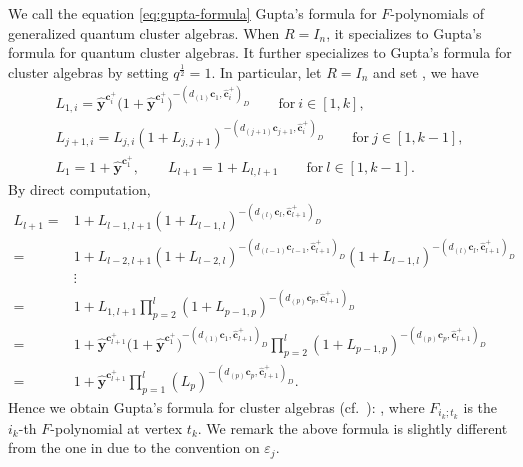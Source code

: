 \documentclass[pdftex]{sigma}
\numberwithin{equation}{section}
\begin{document}
\begin{Remark}
 We call the equation \eqref{eq:gupta-formula} Gupta's formula for $F$-polynomials of generalized quantum cluster algebras. When $R=I_n$, it specializes to Gupta's formula
 for quantum cluster algebras. It further specializes to Gupta's formula \cite{gupta2019,LMN2023} for cluster algebras by setting $q^{\frac{1}{2}}=1$. In particular, let $R=I_n$ and set , we have
 \begin{gather*}
L_{1,i}=\hat{\mathbf{y}}^{\mathbf{c}_{i}^+}\bigl(1+\hat{\mathbf{y}}^{\mathbf{c}_{1}^{+}}\bigr)^{-(d_{(1)}\mathbf{c}_{1},\hat{\mathbf{c}}_{i}^{+})_{D}}\qquad \text{for} \ i\in[1,k],\\
L_{j+1,i}=L_{j,i}(1+L_{j,j+1})^{-(d_{(j+1)}\mathbf{c}_{j+1},\hat{\mathbf{c}}_{i}^{+})_D}\qquad \text{for} \  j\in[1,k-1],\\
L_{1}=1+\hat{\mathbf{y}}^{\mathbf{c}_{1}^{+}},\qquad
L_{l+1}=1+L_{l,l+1}\qquad \text{for} \  l\in[1,k-1].
\end{gather*}
By direct computation,
\begin{align*}
 L_{l+1}={}&1+L_{l-1,l+1}(1+L_{l-1,l})^{-(d_{(l)}\mathbf{c}_{l},\hat{\mathbf{c}}_{l+1}^{+})_D}\\
 ={}&1+L_{l-2,l+1}(1+L_{l-2,l})^{-(d_{(l-1)}\mathbf{c}_{l-1},\hat{\mathbf{c}}_{l+1}^{+})_D}(1+L_{l-1,l})^{-(d_{(l)}\mathbf{c}_{l},\hat{\mathbf{c}}_{l+1}^{+})_D}\\
 & \vdots\\
 ={}&1+L_{1,l+1}\prod\limits^{l}_{p=2}(1+L_{p-1,p})^{-(d_{(p)}\mathbf{c}_{p},\hat{\mathbf{c}}_{l+1}^{+})_D}\\
 ={}&1+\hat{\mathbf{y}}^{\mathbf{c}_{l+1}^{+}}\bigl(1+\hat{\mathbf{y}}^{\mathbf{c}_{1}^{+}}\bigr)^{-(d_{(1)}\mathbf{c}_{1},\hat{\mathbf{c}}_{l+1}^{+})_D}\prod\limits^{l}_{p=2}(1+L_{p-1,p})^{-(d_{(p)}\mathbf{c}_{p},\hat{\mathbf{c}}_{l+1}^{+})_D}\\
={}&1+\hat{\mathbf{y}}^{\mathbf{c}_{l+1}^{+}}\prod\limits^{l}_{p=1}(L_{p})^{-(d_{(p)}\mathbf{c}_{p},\hat{\mathbf{c}}_{l+1}^{+})_D}.
\end{align*}
Hence we obtain Gupta's formula for cluster algebras (cf.\ \cite{LMN2023}):
,
where $F_{i_k;t_k}$ is the $i_k$-th $F$-polynomial at vertex $t_k$. We remark the above formula is slightly different from the one in \cite{LMN2023} due to the convention on $\varepsilon_j$.
\end{Remark}
\end{document}
